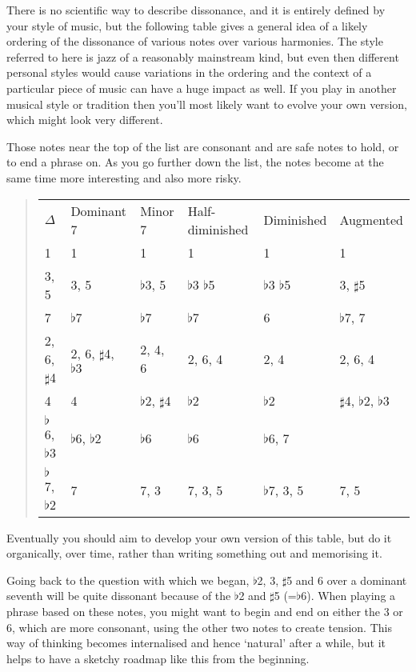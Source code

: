 \documentclass[english]{./gbook}
\begin{document}
\begin{large}
There is no scientific way to describe dissonance, and it is entirely defined by your style of music, but the following table gives a general idea of a likely ordering of the dissonance of various notes over various harmonies. The style referred to here is jazz of a reasonably mainstream kind, but even then different personal styles would cause variations in the ordering and the context of a particular piece of music can have a huge impact as well. If you play in another musical style or tradition then you'll most likely want to evolve your own version, which might look very different.

Those notes near the top of the list are consonant and are safe notes to hold, or to end a phrase on. As you go further down the list, the notes become at the same time more interesting and also more risky.
\begin{quote}
	\begin{tabular}{llllll}
		$\Delta$	&	Dominant 7	&	Minor 7	&	Half-diminished	&	Diminished	&	Augmented \\
		1  &	 1  &	 1  &	 1  &	 1  &	 1  \\
		3, 5&3, 5 &$\flat$3, 5 & $\flat$3 $\flat$5 & $\flat$3 $\flat$5 & 3, $\sharp$5 \\
		7 & $\flat$7 & $\flat$7 & $\flat$7  & 6 & $\flat$7, 7\\
		2, 6, $\sharp$4 & 2, 6, $\sharp$4, $\flat 3$ & 2, 4, 6 & 2, 6, 4 & 2, 4 & 2, 6, 4 \\
		4 & 4 & $\flat$2, $\sharp$4 & $\flat$2 & $\flat$2 & $\sharp$4, $\flat$2, $\flat$3 \\
		$\flat$6,$\flat$3  & $\flat$6, $\flat$2 &$\flat$6 &  $\flat$6 & $\flat$6, 7 & \\
		$\flat$7, $\flat$2 & 7 & 7, 3 & 7, 3, 5 & $\flat$7, 3, 5 & 7, 5
	\end{tabular}
\end{quote}
Eventually you should aim to develop your own version of this table, but do it organically, over time, rather than writing something out and memorising it.

Going back to the question with which we began, $\flat$2, 3, $\sharp$5 and 6 over a dominant seventh will be quite dissonant because of the $\flat$2 and $\sharp$5 (=$\flat$6). When playing a phrase based on these notes, you might want to begin and end on either the 3 or 6, which are more consonant, using the other two notes to create tension. This way of thinking becomes internalised and hence `natural' after a while, but it helps to have a sketchy roadmap like this from the beginning.


\end{large}
\end{document}
